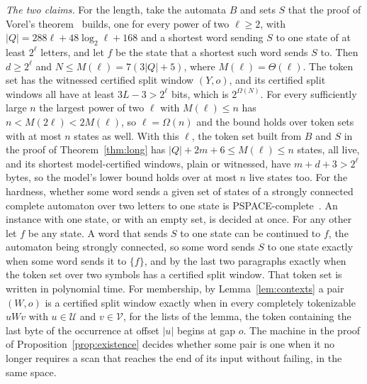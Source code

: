 \documentclass[11pt,a4paper]{article}
\theoremstyle{definition}
\theoremstyle{plain}
\begin{document}
\emph{The two claims.} For the length, take the automata $B$ and sets $S$ that the proof of Vorel's
theorem~\cite[Theorem~8, p.~378]{vorel2014subset} builds, one for every power of two $\ell \geq 2$, with
$|Q| = 288 \ell + 48 \log_2 \ell + 168$ and a shortest word sending $S$ to one state of at least $2^\ell$ letters, and
let $f$ be the state that a shortest such word sends $S$ to. Then $d \geq 2^\ell$ and $N \leq M(\ell) = 7 (3 |Q| + 5)$,
where $M(\ell) = \Theta(\ell)$. The token set has the witnessed certified split window $(Y, o)$, and its certified split
windows all have at least $3L - 3 > 2^\ell$ bits, which is $2^{\Omega(N)}$. For every sufficiently large $n$ the largest
power of two $\ell$ with $M(\ell) \leq n$ has $n < M(2 \ell) < 2 M(\ell)$, so $\ell = \Omega(n)$ and the bound holds
over token sets with at most $n$ states as well. With this $\ell$, the token set built from $B$ and $S$ in the proof of
Theorem~\ref{thm:long} has $|Q| + 2m + 6 \leq M(\ell) \leq n$ states, all live, and its shortest model-certified
windows, plain or witnessed, have $m + d + 3 > 2^\ell$ bytes, so the model's lower bound holds over at most $n$ live
states too. For the hardness, whether some word sends a given set of states of a strongly connected complete automaton
over two letters to one state is PSPACE-complete~\cite[Theorem~11, p.~379]{vorel2014subset}. An instance with one state,
or with an empty set, is decided at once. For any other let $f$ be any state. A word that sends $S$ to one state can be
continued to $f$, the automaton being strongly connected, so some word sends $S$ to one state exactly when some word
sends it to $\{f\}$, and by the last two paragraphs exactly when the token set over two symbols has a certified split
window. That token set is written in polynomial time. For membership, by Lemma~\ref{lem:contexts} a pair $(W, o)$ is a
certified split window exactly when in every completely tokenizable $u W v$ with $u \in \mathcal{U}$ and
$v \in \mathcal{V}$, for the lists of the lemma, the token containing the last byte of the occurrence at offset $|u|$
begins at gap $o$. The machine in the proof of Proposition~\ref{prop:existence} decides whether some pair is one when it
no longer requires a scan that reaches the end of its input without failing, in the same space.




\end{document}
